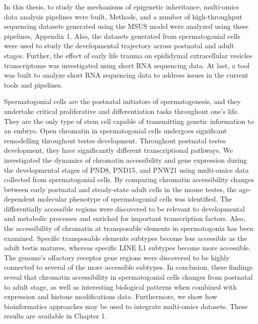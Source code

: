 \documentclass[12pt,twoside]{reedthesis}
\begin{document}
In this thesis, to study the mechanisms of epigenetic inheritance, multi-omics data analysis pipelines were built, Methods, and a number of high-throughput sequencing datasets generated using the MSUS model were analyzed using these pipelines, Appendix 1. Also, the datasets generated from spermatogonial cells were used to study the developmental trajectory across postnatal and adult stages. Further, the effect of early life trauma on epididymal extracellular vesicles transcriptome was investigated using short RNA sequencing data. At last, a tool was built to analyze short RNA sequencing data to address issues in the current tools and pipelines.

Spermatogonial cells are the postnatal initiators of spermatogenesis, and they undertake critical proliferative and differentiation tasks throughout one's life. They are the only type of stem cell capable of transmitting genetic information to an embryo. Open chromatin in spermatogonial cells undergoes significant remodelling throughout testes development. Throughout postnatal testes development, they have significantly different transcriptional pathways. We investigated the dynamics of chromatin accessibility and gene expression during the developmental stages of PND8, PND15, and PNW21 using multi-omics data collected from spermatogonial cells. By comparing chromatin accessibility changes between early postnatal and steady-state adult cells in the mouse testes, the age-dependent molecular phenotype of spermatogonial cells was identified. The differentially accessible regions were discovered to be relevant to developmental and metabolic processes and enriched for important transcription factors. Also, the accessibility of chromatin at transposable elements in spermatogonia has been examined. Specific transposable elements subtypes become less accessible as the adult testis matures, whereas specific LINE L1 subtypes become more accessible. The genome's olfactory receptor gene regions were discovered to be highly connected to several of the more accessible subtypes. In conclusion, these findings reveal that chromatin accessibility in spermatogonial cells changes from postnatal to adult stage, as well as interesting biological patterns when combined with expression and histone modifications data. Furthermore, we show how bioinformatics approaches may be used to integrate multi-omics datasets. These results are available in Chapter 1.
\end{document}
